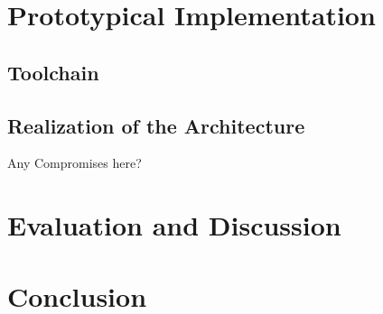 \documentclass[language=english,noinputenc]{wiwwuwordrprt}
\begin{document}
  

  \chapter{Prototypical Implementation} %
  \label{cha:implementation}

    \section{Toolchain} %
    \label{sec:toolchain}
    

    \section{Realization of the Architecture} %
    \label{sec:realization_of_the_architecture}
    Any Compromises here?
  

  \chapter{Evaluation and Discussion} %
  \label{cha:evaluation}
  

  \chapter{Conclusion} %
  \label{cha:conclusion}
  
  
  
  
\end{document}
